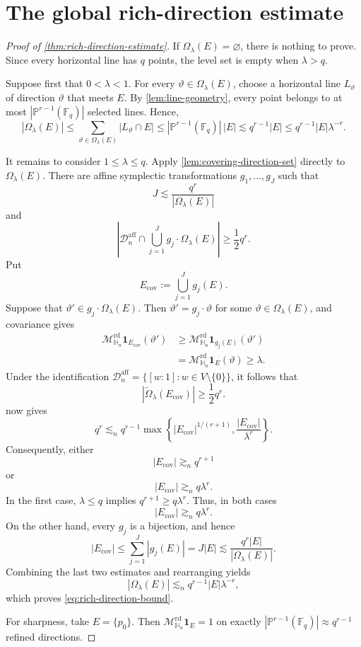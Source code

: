 \documentclass[11pt,letterpaper]{amsart}
\numberwithin{equation}{section}
\theoremstyle{definition}
\theoremstyle{remark}
\newcommand{\Fq}{\mathbb F_q}
\newcommand{\PP}{\mathbb P}
\newcommand{\HH}{\mathbb H}
\newcommand{\Dn}{\mathcal D_n}
\newcommand{\Mrd}{\mathcal M^{\mathrm{rd}}_{\HH_n}}
\newcommand{\one}{\mathbf 1}
\begin{document}
\section{The global rich-direction estimate}
\label{sec:global-rich-direction}

\begin{proof}[Proof of \cref{thm:rich-direction-estimate}]
If $\Omega_\lambda(E)=\varnothing$, there is nothing to prove.  Since
every horizontal line has $q$ points, the level set is empty when
$\lambda>q$.

Suppose first that $0<\lambda<1$.  For every
$\vartheta\in\Omega_\lambda(E)$, choose a horizontal line
$L_\vartheta$ of direction $\vartheta$ that meets $E$.  By
\cref{lem:line-geometry}, every point belongs to at most
$|\PP^{r-1}(\Fq)|$ selected lines. Hence,
\[
 |\Omega_\lambda(E)|
 \leq\sum_{\vartheta\in\Omega_\lambda(E)}|L_\vartheta\cap E|
 \leq|\PP^{r-1}(\Fq)|\,|E|
 \lesssim q^{r-1}|E|
 \leq q^{r-1}|E|\lambda^{-r}.
\]

It remains to consider $1\leq\lambda\leq q$. Apply
\cref{lem:covering-direction-set} directly to
$\Omega_\lambda(E)$. There are affine symplectic transformations
$g_1,\ldots,g_J$ such that
\[
 J\lesssim\frac{q^r}{|\Omega_\lambda(E)|}
\]
and
\[
 \left|
 \Dn^{\mathrm{aff}}\cap
 \bigcup_{j=1}^Jg_j\cdot\Omega_\lambda(E)
 \right|
 \geq\frac12q^r.
\]
Put
\[
 E_{\mathrm{cov}}:=\bigcup_{j=1}^Jg_j(E).
\]
Suppose that $\vartheta'\in g_j\cdot\Omega_\lambda(E)$. Then
$\vartheta'=g_j\cdot\vartheta$ for some
$\vartheta\in\Omega_\lambda(E)$, and covariance gives
\begin{align*}
 \Mrd\one_{E_{\mathrm{cov}}}(\vartheta')
 &\geq\Mrd\one_{g_j(E)}(\vartheta')\\
 &=\Mrd\one_E(\vartheta)
 \geq\lambda.
\end{align*}
Under the identification
$\Dn^{\mathrm{aff}}=\{[w:1]:w\in V\setminus\{0\}\}$, it follows that
\[
 |\widetilde\Omega_\lambda(E_{\mathrm{cov}})|
 \geq\frac12q^r.
\]
 now gives
\[
 q^r
 \lesssim_n q^{r-1}
 \max\left\{
 |E_{\mathrm{cov}}|^{1/(r+1)},
 \frac{|E_{\mathrm{cov}}|}{\lambda^r}
 \right\}.
\]
Consequently, either
\[
 |E_{\mathrm{cov}}|\gtrsim_n q^{r+1}
\]
or
\[
 |E_{\mathrm{cov}}|\gtrsim_n q\lambda^r.
\]
In the first case, $\lambda\leq q$ implies
$q^{r+1}\geq q\lambda^r$. Thus, in both cases
\[
 |E_{\mathrm{cov}}|\gtrsim_n q\lambda^r.
\]
On the other hand, every $g_j$ is a bijection, and hence
\[
 |E_{\mathrm{cov}}|
 \leq\sum_{j=1}^J|g_j(E)|
 =J|E|
 \lesssim\frac{q^r|E|}{|\Omega_\lambda(E)|}.
\]
Combining the last two estimates and rearranging yields
\[
 |\Omega_\lambda(E)|
 \lesssim_n q^{r-1}|E|\lambda^{-r},
\]
which proves \eqref{eq:rich-direction-bound}.

For sharpness, take $E=\{p_0\}$. Then $\Mrd\one_E=1$ on exactly
$|\PP^{r-1}(\Fq)|\approx q^{r-1}$ refined directions.  
\end{proof}
\end{document}
